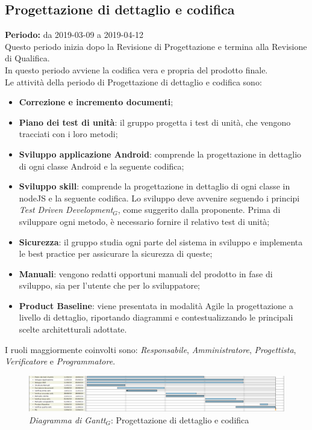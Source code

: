 \begin{flushleft}
\section{Progettazione di dettaglio e codifica}\label{PrDeC}
\textbf{Periodo:} da 2019-03-09 a 2019-04-12\\
Questo periodo inizia dopo la Revisione di Progettazione e termina  alla Revisione di Qualifica.\\
In questo periodo avviene la codifica vera e propria del prodotto finale.\\
Le attività della periodo di Progettazione di dettaglio e codifica sono:
\begin{itemize}
	\item \textbf{Correzione e incremento documenti}; 
	\item \textbf{Piano dei test di unità}: il gruppo progetta i test di unità, che vengono tracciati con i loro metodi; 
	\item \textbf{Sviluppo applicazione Android}: comprende la progettazione in dettaglio di ogni classe Android e la seguente codifica;
	\item \textbf{Sviluppo skill}: comprende la progettazione in dettaglio di ogni classe in nodeJS e la seguente codifica. Lo sviluppo deve avvenire seguendo i principi \textit{Test Driven Development$_{G}$}, come suggerito dalla proponente. Prima di sviluppare ogni metodo, è necessario fornire il relativo test di unità;
	\item \textbf{Sicurezza}: il gruppo studia ogni parte del sistema in sviluppo e implementa le best practice per assicurare la sicurezza di queste;
	\item \textbf{Manuali}: vengono redatti opportuni manuali del prodotto in fase di sviluppo, sia per l'utente che per lo sviluppatore;
	\item \textbf{Product Baseline}: viene presentata in modalità Agile la progettazione a livello di dettaglio, riportando diagrammi e contestualizzando le principali scelte architetturali adottate.
\end{itemize}
I ruoli maggiormente coinvolti sono: \textit{Responsabile}, \textit{Amministratore}, \textit{Progettista}, \textit{Verificatore} e \textit{Programmatore}.
\begin{figure} [h]
   
    \includegraphics[scale=0.2]{./images/ZeroSevenGanttCodificaDettaglio.png}
    \caption{\textit{Diagramma di Gantt$_{G}$}: Progettazione di dettaglio e codifica }\label{G4}
\end{figure}


\end{flushleft}
